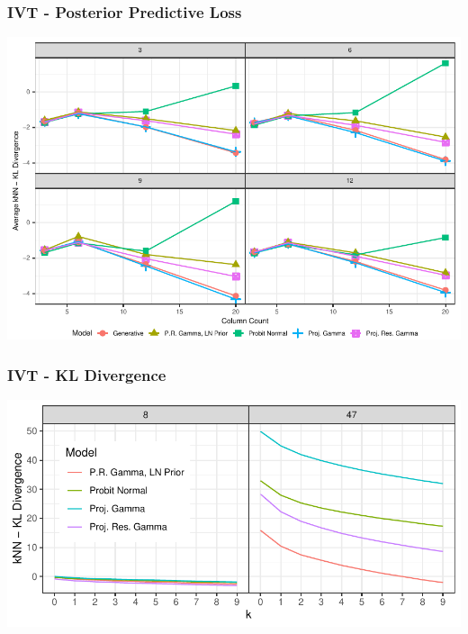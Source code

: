\documentclass[aspectratio=169]{beamer}
\newlength{\frametextheight}
\begin{document}
\begin{frame}
  \frametitle{IVT - Posterior Predictive Loss}
  \begin{center}
    \includegraphics[height=\frametextheight]{./images/simulation_knn_kld}
  \end{center}
\end{frame}

\begin{frame}
  \frametitle{IVT - KL Divergence}
  \begin{center}
    \includegraphics[height=\frametextheight]{./images/knn_kld}
  \end{center}
\end{frame}
\end{document}
